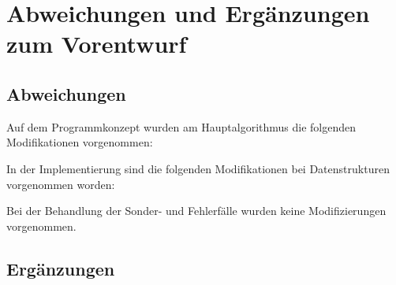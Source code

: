 \chapter{Abweichungen und Erg\"anzungen zum Vorentwurf}
\label{Abweichungen}
\section{Abweichungen}
Auf dem Programmkonzept wurden am Hauptalgorithmus die folgenden Modifikationen vorgenommen:

In der Implementierung sind die folgenden Modifikationen bei Datenstrukturen vorgenommen worden:

Bei der Behandlung der Sonder- und Fehlerfälle wurden keine Modifizierungen vorgenommen.

\section{Ergänzungen}

\cleardoublepage